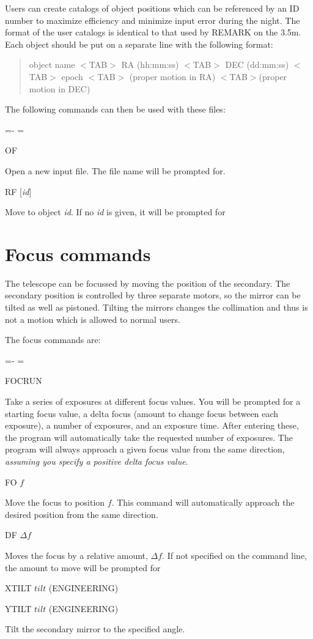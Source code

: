 \documentclass[10pt]{report}
\renewcommand{\[}{\begin{eqnarray}}
\renewcommand{\]}{\end{eqnarray}}
\newenvironment{hanging}{
	\begin{list}{}{
		\labelsep=0pt
		\labelwidth=0pt
		\listparindent=0pt
		\itemindent=-\leftmargini
		\leftmargin=\leftmargini
	}
}{
	\end{list}
}
\begin{document}
Users can create catalogs of object positions which can be referenced by
an ID number to maximize efficiency and minimize input error during the
night. The format of the user catalogs is identical to that used by REMARK
on the 3.5m. Each object should be put on a separate line with the following
format:
\begin{quote}
object name $<$TAB$>$ RA (hh:mm:ss) $<$TAB$>$ DEC (dd:mm:ss) $<$TAB$>$ epoch $<$TAB$>$ (proper motion in RA) $<$TAB$>$(proper motion in DEC)
\end{quote}

The following commands can then be used with these files:

\begin{hanging}
\item{OF}

Open a new input file. The file name will be prompted for.

\item{RF [{\it id}]}

Move to object {\it id}. If no {\it id} is given, it will be prompted for

\end{hanging}

\section{Focus commands}

The telescope can be focussed by moving the position of the secondary. 
The secondary position is controlled by three separate motors, so the
mirror can be tilted as well as pistoned. Tilting the mirrors changes
the collimation and thus is not a motion which is allowed to normal users.

The focus commands are:

\begin{hanging}
\item{FOCRUN}

Take a series of exposures at different focus values. You will be prompted
for a starting focus value, a delta focus (amount to change focus between
each exposure), a number of exposures, and an exposure time. After entering
these, the program will automatically take the requested number of exposures.
The program will always approach a given focus value from the same direction,
\textit{assuming you specify a positive delta focus value}.

\item{FO {$f$}}

Move the focus to position $f$. This command will automatically approach
the desired position from the same direction.

\item{DF {$\Delta f$}}

Moves the focus by a relative amount, $\Delta f$. If not specified on the
command line, the amount to move will be prompted for

\item{XTILT $tilt$ (ENGINEERING)}
\item{YTILT $tilt$ (ENGINEERING)}

Tilt the secondary mirror to the specified angle.
\end{hanging}
\end{document}
